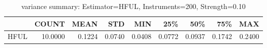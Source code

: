 \begin{table}[ht]
\centering
\caption{variance summary: Estimator=HFUL, Instruments=200, Strength=0.10}
\begin{tabular}{lrrrrrrrr}
\toprule
 & COUNT & MEAN & STD & MIN & 25\% & 50\% & 75\% & MAX \\
\midrule
HFUL & 10.0000 & 0.1224 & 0.0740 & 0.0408 & 0.0772 & 0.0937 & 0.1742 & 0.2400 \\
\bottomrule
\end{tabular}
\end{table}
